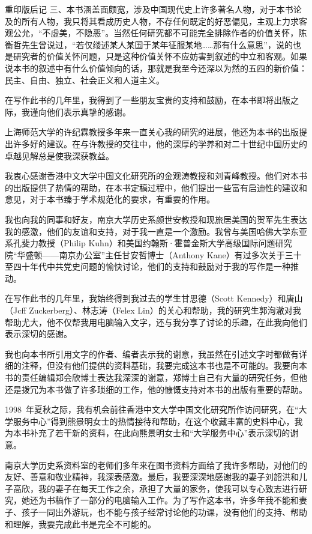 \begin{pre-post-text}{重印版后记}
三、本书涵盖面颇宽，涉及中国现代史上许多著名人物，对于本书论及的所有人物，我只将其看成历史人物，不存任何既定的好恶偏见，主观上力求客观公允，“不虚美，不隐恶”。当然任何研究都不可能完全排除作者的价值关怀，陈衡哲先生曾说过，“若仅缕述某人某国于某年征服某地……那有什么意思”，说的也是研究者的价值关怀问题，只是这种价值关怀不应妨害到叙述的中立和客观。如果说本书的叙述中有什么价值倾向的话，那就是我至今还深以为然的五四的新价值：民主、自由、独立、社会正义和人道主义。

在写作此书的几年里，我得到了一些朋友宝贵的支持和鼓励，在本书即将出版之际，我谨向他们表示真挚的感谢。

上海师范大学的许纪霖教授多年来一直关心我的研究的进展，他还为本书的出版提出许多好的建议。在与许教授的交往中，他的深厚的学养和对二十世纪中国历史的卓越见解总是使我深获教益。

我衷心感谢香港中文大学中国文化研究所的金观涛教授和刘青峰教授。他们对本书的出版提供了热情的帮助，在本书定稿过程中，他们提出一些富有启迪性的建议和意见，对于本书臻于学术规范化的要求，有重要的作用。

我也向我的同事和好友，南京大学历史系颜世安教授和现旅居美国的贺军先生表达我的感激，他们的友谊和支持，对于我一直是一个激励。我曾与美国哈佛大学东亚系孔斐力教授（Philip Kuhn）和美国约翰斯·霍普金斯大学高级国际问题研究院“华盛顿——南京办公室”主任甘安哲博士（Anthony Kane）有过多次关于三十至四十年代中共党史问题的愉快讨论，他们的支持和鼓励对于我的写作是一种推动。

在写作此书的几年里，我始终得到我过去的学生甘思德（Scott Kennedy）和唐山（Jcff Zuckerberg）、林志涛（Felex Lin）的关心和帮助，我的研究生郭洵澈对我帮助尤大，他不仅帮我用电脑输入文字，还与我分享了讨论的乐趣，在此我向他们表示深切的感谢。

我也向本书所引用文字的作者、编者表示我的谢意，我虽然在引述文字时都做有详细的注释，但没有他们提供的资料基础，我要完成这本书也是不可能的。我要向本书的责任编辑郑会欣博士表达我深深的谢意，郑博士自己有大量的研究任务，但他还是拨冗为本书做了许多琐细的工作，他的慷慨支持对本书的出版有重要的帮助。

1998~年夏秋之际，我有机会前往香港中文大学中国文化研究所作访问研究，在“大学服务中心”得到熊景明女士的热情接待和帮助，在这个收藏丰富的史料中心，我为本书补充了若干新的资料，在此向熊景明女士和“大学服务中心”表示深切的谢意。

南京大学历史系资料室的老师们多年来在图书资料方面给了我许多帮助，对他们的友好、善意和敬业精神，我深表感激。最后，我要深深地感谢我的妻子刘韶洪和儿子高欣，我的妻子在每天工作之余，承担了大量的家务，使我可以专心致志进行研究，她还为书稿作了一部分的电脑输入工作。为了写作这本书，许多年我不能和妻子、孩子一同出外游玩，也不能与孩子经常讨论他的功课，没有他们的支持、帮助和理解，我要完成此书是完全不可能的。

\end{pre-post-text}


